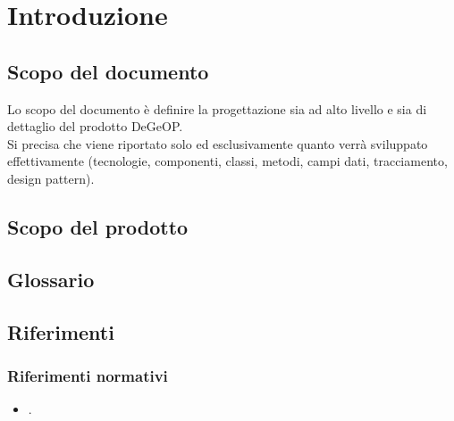 \newpage
\section{Introduzione}
	\subsection {Scopo del documento}
	Lo scopo del documento è definire la progettazione sia ad alto livello e sia di dettaglio del prodotto DeGeOP. 
	\\Si precisa che viene riportato solo ed esclusivamente quanto verrà sviluppato effettivamente (tecnologie, componenti, classi, metodi, campi dati, tracciamento, design pattern).
	
	\subsection {Scopo del prodotto}
	\introScopo
	\subsection {Glossario}
	\introGlossario
	\subsection {Riferimenti}
	\subsubsection{Riferimenti normativi}
	\begin{itemize}
		\item \ndpv.
	\end{itemize}
